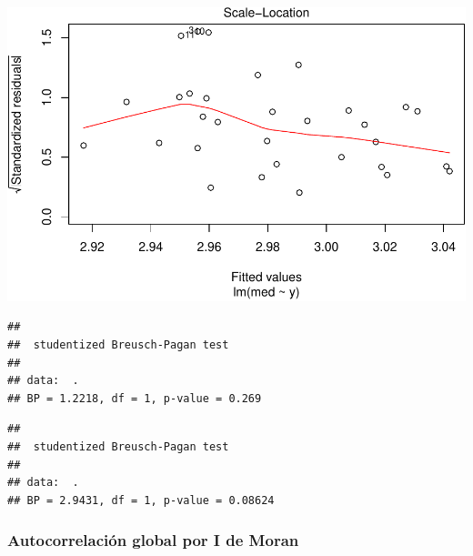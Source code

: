 \documentclass[11pt,]{article}
\newenvironment{Shaded}{\begin{snugshade}}{\end{snugshade}}
\newcommand{\KeywordTok}[1]{\textcolor[rgb]{0.13,0.29,0.53}{\textbf{#1}}}
\newcommand{\StringTok}[1]{\textcolor[rgb]{0.31,0.60,0.02}{#1}}
\newcommand{\OperatorTok}[1]{\textcolor[rgb]{0.81,0.36,0.00}{\textbf{#1}}}
\newcommand{\NormalTok}[1]{#1}
\begin{document}
\includegraphics{proyecto_files/figure-latex/unnamed-chunk-12-2.pdf}

\begin{Shaded}
\end{Shaded}

\begin{verbatim}
## 
##  studentized Breusch-Pagan test
## 
## data:  .
## BP = 1.2218, df = 1, p-value = 0.269
\end{verbatim}

\begin{Shaded}
\end{Shaded}

\begin{verbatim}
## 
##  studentized Breusch-Pagan test
## 
## data:  .
## BP = 2.9431, df = 1, p-value = 0.08624
\end{verbatim}

\subsubsection{Autocorrelación global por I de
Moran}\label{autocorrelaciuxf3n-global-por-i-de-moran-1}
\end{document}
